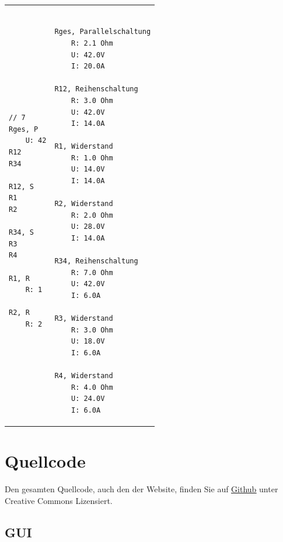 \documentclass[a4paper,10pt,ngerman]{scrartcl}
\begin{document}
\begin{tabular}{p{}p{}}
\raggedright
\begin{verbatim}

// 7
Rges, P
    U: 42
R12
R34

R12, S
R1
R2

R34, S
R3
R4

R1, R
    R: 1

R2, R
    R: 2

\end{verbatim}   &
\raggedleft
\begin{verbatim}

Rges, Parallelschaltung
    R: 2.1 Ohm
    U: 42.0V
    I: 20.0A

R12, Reihenschaltung
    R: 3.0 Ohm
    U: 42.0V
    I: 14.0A

R1, Widerstand
    R: 1.0 Ohm
    U: 14.0V
    I: 14.0A

R2, Widerstand
    R: 2.0 Ohm
    U: 28.0V
    I: 14.0A

R34, Reihenschaltung
    R: 7.0 Ohm
    U: 42.0V
    I: 6.0A

R3, Widerstand
    R: 3.0 Ohm
    U: 18.0V
    I: 6.0A

R4, Widerstand
    R: 4.0 Ohm
    U: 24.0V
    I: 6.0A

\end{verbatim}
\end{tabular}

\newpage
\section{Quellcode}

Den gesamten Quellcode, auch den der Website, finden Sie auf \href{https://github.com/HeIIow2/physik_schaltkreise}{\underline{Github}} unter Creative Commons Lizensiert.

\subsection{GUI}
\end{document}
